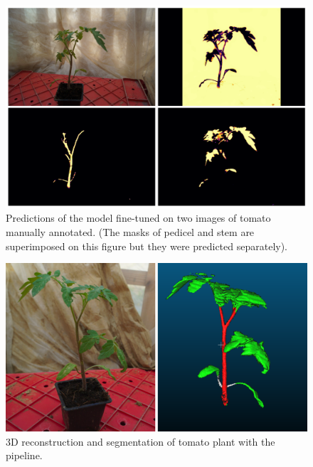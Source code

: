 \begin{figure}[h!]
    \centering \includegraphics[width = \linewidth]{figures/finetune.png}
    \caption{Predictions of the model fine-tuned on two images of tomato manually annotated. (The masks of pedicel and stem are superimposed on this figure but they were predicted separately).} \label{fig:finetune2D}
\end{figure}


\begin{figure}[h!]
    \centering \includegraphics[width = \linewidth]{figures/tomato.png}
    \caption{3D reconstruction and segmentation of tomato plant with the pipeline.} \label{fig:finetune3D}
\end{figure}


